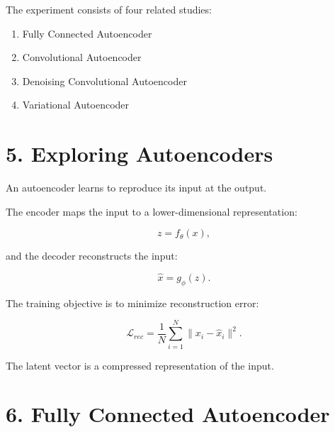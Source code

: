 \documentclass[10pt]{article}
\begin{document}
The experiment consists of four related studies:

\begin{enumerate}
\item Fully Connected Autoencoder
\item Convolutional Autoencoder
\item Denoising Convolutional Autoencoder
\item Variational Autoencoder
\end{enumerate}

\section*{5. Exploring Autoencoders}

An autoencoder learns to reproduce its input at the output.

The encoder maps the input to a lower-dimensional representation:

\[
z=f_{\theta}(x),
\]

and the decoder reconstructs the input:

\[
\hat{x}=g_{\phi}(z).
\]

The training objective is to minimize reconstruction error:

\[
\mathcal{L}_{rec}
=
\frac{1}{N}\sum_{i=1}^{N}
\|x_i-\hat{x}_i\|^2.
\]

\begin{center}
\end{center}

The latent vector is a compressed representation of the input.

\section*{6. Fully Connected Autoencoder}
\end{document}
